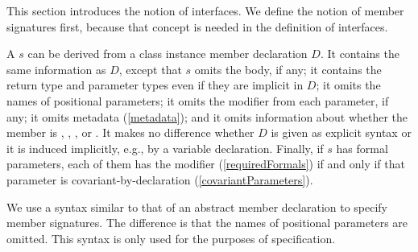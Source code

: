 \documentclass[makeidx]{article}
\begin{document}
\LMHash{}%
This section introduces the notion of interfaces.
We define the notion of member signatures first,
because that concept is needed in the definition of interfaces.


\LMHash{}%
A  $s$
can be derived from a class instance member declaration $D$.
It contains the same information as $D$,
except that $s$ omits the body, if any;
it contains the return type and parameter types
even if they are implicit in $D$;
it omits the names of positional parameters;
it omits the modifier \FINAL{} from each parameter, if any;
it omits metadata
(\ref{metadata});
and it omits information about whether the member is
\EXTERNAL, \ASYNC, \ASYNC*, or \SYNC*.
It makes no difference whether $D$ is given as explicit syntax
or it is induced implicitly, e.g., by a variable declaration.
Finally, if $s$ has formal parameters,
each of them has the modifier \COVARIANT{}
(\ref{requiredFormals})
if and only if that parameter is covariant-by-declaration
(\ref{covariantParameters}).

\LMHash{}%
We use a syntax similar to that of an abstract member declaration
to specify member signatures.
The difference is that the names of positional parameters are omitted.
This syntax is only used for the purposes of specification.

\end{document}
